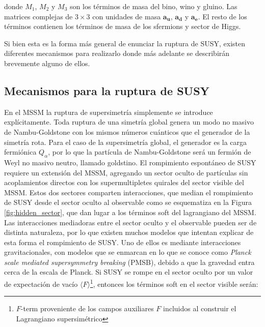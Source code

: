 \noindent
donde $M_1$, $M_2$ y $M_3$ son los términos de masa del bino, wino y gluino. Las matrices complejas de $3\times3$ con unidades de masa $\textbf{a}_\textbf{u}$, $\textbf{a}_\textbf{d}$ y $\textbf{a}_\textbf{e}$.
El resto de los términos contienen los términos de masa de los sfermions y sector de Higgs.

Si bien esta es la forma más general de enunciar la ruptura de SUSY, existen diferentes mecanismos para realizarlo donde más adelante se describirán brevemente alguno de ellos.

\subsection{Mecanismos para la ruptura de SUSY}


En el MSSM la ruptura de supersimetría simplemente se introduce explícitamente. Toda ruptura de una simetría global genera un modo no masivo de Nambu-Goldstone con los mismos números cuánticos que el generador de la simetría rota.
Para el caso de la supersimetría global, el generador es la carga fermiónica $Q_{\alpha}$,
por lo que la partícula de Nambu-Goldstone será un fermión de Weyl no masivo
neutro, llamado goldstino.
El rompimiento espontáneo de SUSY requiere un extensión del MSSM, agregando un sector oculto de partículas sin acoplamientos directos con los supermultipletes quirales del sector visible del
MSSM. Estos dos sectores comparten interacciones, que median el rompimiento de
SUSY desde el sector oculto al observable como se esquematiza en la Figura \ref{fig:hidden_sector}, que dan lugar a los términos soft del lagrangiano del MSSM.
Las interacciones mediadoras entre el sector oculto y el observable pueden ser
de distinta naturaleza, por lo que existen muchos modelos que intentan explicar de
esta forma el rompimiento de SUSY. Uno de ellos es mediante interacciones gravitacionales, con modelos que se enmarcan en lo que se conoce como \textit{Planck scale mediated supersymmetry breaking} (PMSB), debido a que la gravedad entra cerca de la escala de Planck. Si SUSY se rompe en el sector oculto por un valor de expectación de vacío $\langle F \rangle$\footnote{$F$-term proveniente de los campos auxiliares $F$ incluidos al construir el Lagrangiano supersimétrico}, entonces los términos soft en el sector visible serán:

